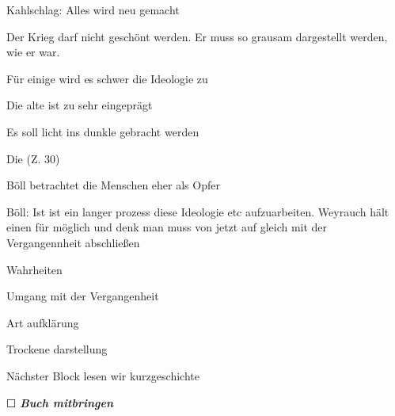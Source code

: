 \startsectionlevel[title={Wolfgang
Weyrauch},reference={wolfgang-weyrauch}]

\startitemize[packed]
\item
  Kahlschlag: Alles wird neu gemacht
\item
  Der Krieg darf nicht geschönt werden. Er muss so grausam dargestellt
  werden, wie er war.
\item
  Für einige wird es schwer die Ideologie zu 
  \startitemize[packed]
  \item
    Die alte ist zu sehr eingeprägt
  \stopitemize
\item
  Es soll licht ins dunkle gebracht werden
\item
  Die   (Z. 30)
\stopitemize

\stopsectionlevel

\startsectionlevel[title={Heinrich Böll},reference={heinrich-böll}]

\stopsectionlevel

\startsectionlevel[title={Unterschiede},reference={unterschiede}]

\startitemize[packed]
\item
  Böll betrachtet die Menschen eher als Opfer
\item
  Böll: Ist ist ein langer prozess diese Ideologie etc aufzuarbeiten.
  Weyrauch hält einen  für möglich und denk man muss von
  jetzt auf gleich mit der Vergangennheit abschließen
\stopitemize

\stopsectionlevel

\stopsectionlevel

\startsectionlevel[title={Kernthemen der
Trümmerliteratur},reference={kernthemen-der-trümmerliteratur}]

\startitemize[packed]
\item
  Wahrheiten
\item
  Umgang mit der Vergangenheit
\item
  Art aufklärung
\stopitemize

\stopsectionlevel

\stopsectionlevel

\startsectionlevel[title={Wolfgang
Borchert},reference={wolfgang-borchert}]

\startitemize[packed]
\item
  Trockene darstellung
\stopitemize

Nächster Block lesen wir kurzgeschichte

\startitemize[packed]
\item
  ☐ {\bf {\em Buch mitbringen}}
\stopitemize

\stopsectionlevel
